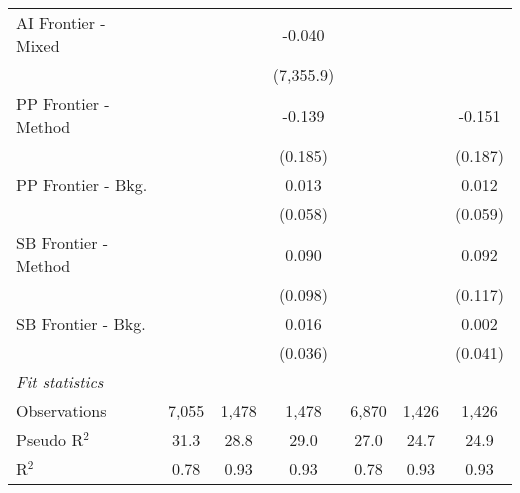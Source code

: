 \begin{tabular}{lcccccc}
   AI Frontier - Mixed  &              &         & -0.040    &              &         &   \\   
                        &              &         & (7,355.9) &              &         &   \\   
   PP Frontier - Method &              &         & -0.139    &              &         & -0.151\\   
                        &              &         & (0.185)   &              &         & (0.187)\\   
   PP Frontier - Bkg.   &              &         & 0.013     &              &         & 0.012\\   
                        &              &         & (0.058)   &              &         & (0.059)\\   
   SB Frontier - Method &              &         & 0.090     &              &         & 0.092\\   
                        &              &         & (0.098)   &              &         & (0.117)\\   
   SB Frontier - Bkg.   &              &         & 0.016     &              &         & 0.002\\   
                        &              &         & (0.036)   &              &         & (0.041)\\   
   \midrule
   \emph{Fit statistics}\\
   Observations         & 7,055        & 1,478   & 1,478     & 6,870        & 1,426   & 1,426\\  
   Pseudo R$^2$         & 31.3         & 28.8    & 29.0      & 27.0         & 24.7    & 24.9\\  
   R$^2$                & 0.78         & 0.93    & 0.93      & 0.78         & 0.93    & 0.93\\  
   

\end{tabular}
